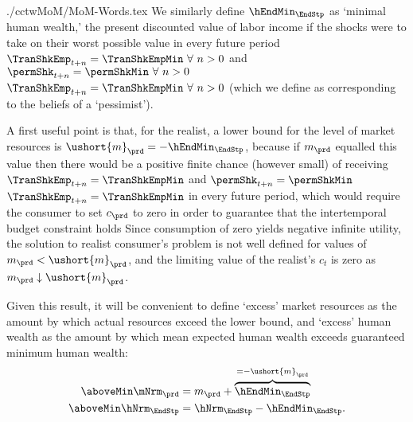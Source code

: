 \documentclass[\econtexRoot/SolvingMicroDSOPs]{subfiles}
\begin{document}
\begin{verbatimwrite}{./cctwMoM/MoM-Words.tex}
  We similarly define $\hEndMin_{\EndStp}$ as `minimal human wealth,' the
  present discounted value of labor income if the shocks were to take on
  their worst possible value in every future period \permShkOn
  {$\TranShkEmp_{t+n} = \TranShkEmpMin ~\forall~n>0$ and $\permShk_{t+n} =
    \permShkMin ~\forall~n>0$} {$\TranShkEmp_{t+n} = \TranShkEmpMin
    ~\forall~n>0$} (which we define as corresponding to the beliefs of a
  `pessimist').


  A first useful point is that, for the realist, a lower bound for the
  level of market resources is $\ushort{m}_{\prd} = -\hEndMin_{\EndStp}$, because
  if $m_{\prd}$ equalled this value then there would be a positive finite
  chance (however small) of receiving \permShkOn
  {$\TranShkEmp_{t+n}=\TranShkEmpMin$ and $\permShk_{t+n}=\permShkMin$}
  {$\TranShkEmp_{t+n}=\TranShkEmpMin$}
  in
  every future period, which would require the consumer to set $c_{\prd}$
  to zero in order to guarantee that the intertemporal budget constraint
  holds  Since consumption of zero yields negative
  infinite utility, the solution to realist consumer's problem is not well
  defined for values of $m_{\prd} < \ushort{m}_{\prd}$, and the limiting
  value of the realist's $c_t$ is zero as $m_{\prd} \downarrow \ushort{m}_{\prd}$.

  Given this result, it will be convenient to define `excess' market
  resources as the amount by which actual resources exceed the lower
  bound, and `excess' human wealth as the amount by which mean expected human wealth
  exceeds guaranteed minimum human wealth:
  \begin{equation*}\begin{gathered}\begin{aligned}
        \aboveMin \mNrm_{\prd}  & = m_{\prd}+\overbrace{\hEndMin_{\EndStp}}^{=-\ushort{m}_{\prd}}
        \\  \aboveMin \hNrm_{\EndStp}  & = \hNrm_{\EndStp}-\hEndMin_{\EndStp}.
      \end{aligned}\end{gathered}\end{equation*}


\end{verbatimwrite}
\end{document}
